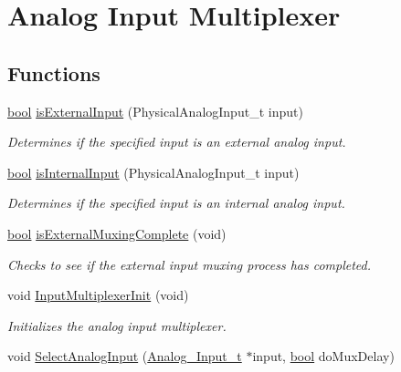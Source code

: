 \hypertarget{group__analog__input__multiplexer}{\section{Analog Input Multiplexer}
\label{group__analog__input__multiplexer}
}
\subsection*{Functions}
\begin{DoxyCompactItemize}
\item 
\hyperlink{group__data__types_ga0ecf26b576b9a54eca656b9be7ba6a06}{bool} \hyperlink{group__analog__input__multiplexer_ga82dce77857c1a4197599b5e53d4c4baf}{is\-External\-Input} (Physical\-Analog\-Input\-\_\-t input)
\begin{DoxyCompactList}\small\item\em Determines if the specified input is an external analog input. \end{DoxyCompactList}\item 
\hyperlink{group__data__types_ga0ecf26b576b9a54eca656b9be7ba6a06}{bool} \hyperlink{group__analog__input__multiplexer_ga9452ba5ad241ec1be905a8683f3aa893}{is\-Internal\-Input} (Physical\-Analog\-Input\-\_\-t input)
\begin{DoxyCompactList}\small\item\em Determines if the specified input is an internal analog input. \end{DoxyCompactList}\item 
\hyperlink{group__data__types_ga0ecf26b576b9a54eca656b9be7ba6a06}{bool} \hyperlink{group__analog__input__multiplexer_ga5b4aed86c91b3b4bbdc4c7e03f6923ef}{is\-External\-Muxing\-Complete} (void)
\begin{DoxyCompactList}\small\item\em Checks to see if the external input muxing process has completed. \end{DoxyCompactList}\item 
void \hyperlink{group__analog__input__multiplexer_ga7f67e83c34a57a26b88716b132d78c9f}{Input\-Multiplexer\-Init} (void)
\begin{DoxyCompactList}\small\item\em Initializes the analog input multiplexer. \end{DoxyCompactList}\item 
void \hyperlink{group__analog__input__multiplexer_ga03ab9244c4f082f5fec2ab96b319db65}{Select\-Analog\-Input} (\hyperlink{struct_analog___input__t}{Analog\-\_\-\-Input\-\_\-t} $\ast$input, \hyperlink{group__data__types_ga0ecf26b576b9a54eca656b9be7ba6a06}{bool} do\-Mux\-Delay)

\end{DoxyCompactItemize}
